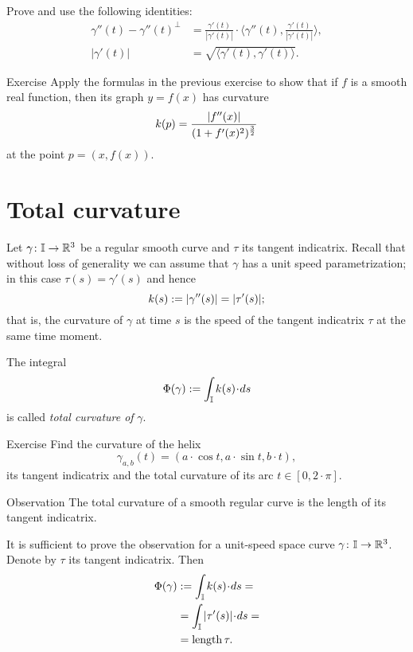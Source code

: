  Prove and use the following identities: 
\begin{align*}
\gamma''(t)-\gamma''(t)^\perp&=\tfrac{\gamma'(t)}{|\gamma'(t)|}\cdot\langle\gamma''(t),\tfrac{\gamma'(t)}{|\gamma'(t)|}\rangle,
\\
|\gamma'(t)|&=\sqrt{\langle \gamma'(t),\gamma'(t)\rangle}.\
\end{align*}


\begin{thm}{Exercise}\label{ex:curvature-graph}
Apply the formulas in the previous exercise to show that if $f$ is a smooth real function,
then its graph $y=f(x)$  has curvature
\[k(p)=\frac{|f''(x)|}{(1+f'(x)^2)^{\frac32}}\]
at the point $p=(x,f(x))$.
\end{thm}

\section*{Total curvature}

Let $\gamma\colon\mathbb{I}\to\mathbb{R}^3$ be a regular smooth curve and $\tau$ its tangent indicatrix.
Recall that without loss of generality we can assume that $\gamma$ has a unit speed parametrization;
in this case $\tau(s)=\gamma'(s)$ and hence
\[k(s):=|\gamma''(s)|=|\tau'(s)|;\] 
that is, the curvature of $\gamma$ at time $s$ is the speed of the tangent indicatrix $\tau$ at the same time moment.

The integral 
\[\tc\gamma:=\int_{\mathbb{I}}\kur(s)\cdot ds\]
is called \emph{total curvature of}\label{page:total curvature of:smooth-def}
$\gamma$.

\begin{thm}{Exercise}\label{ex:helix-curvature}
Find the curvature of the helix \[\gamma_{a,b}(t)=(a\cdot \cos t,a\cdot \sin t,b\cdot t),\] its tangent indicatrix and the total curvature of its arc $t\in[0,2\cdot\pi]$.
\end{thm}

\begin{thm}{Observation}\label{obs:tantrix}
The total curvature of a smooth regular curve is the length of its tangent indicatrix.
\end{thm}

It is sufficient to prove the observation for a unit-speed space curve $\gamma\colon\mathbb{I}\to\mathbb{R}^3$.
Denote by $\tau$ its tangent indicatrix.
Then
\begin{align*}
\tc\gamma&\df\int_{\mathbb{I}}\kur(s)\cdot ds=
\\
&=\int_{\mathbb{I}}|\tau'(s)|\cdot ds=
\\
&=\length\tau.
\end{align*}
\qedsf %

